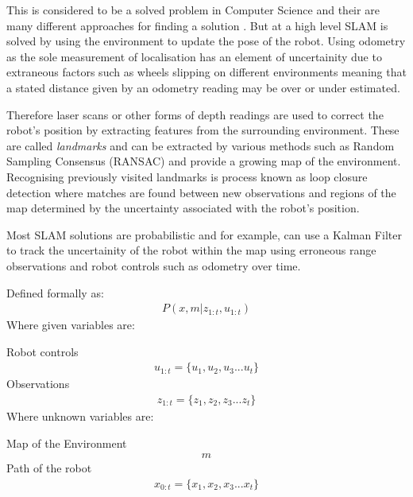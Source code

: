 \documentclass{mproj}
\begin{document}
This is considered to be a solved problem in Computer Science and their are many different approaches for finding a solution \cite{Hugh2006}. But at a high level SLAM is solved by using the environment to update the pose of the robot. Using odometry as the sole measurement of localisation has an element of uncertainity due to extraneous factors such as wheels slipping on different environments meaning that a stated distance given by an odometry reading may be over or under estimated. 

Therefore laser scans or other forms of depth readings are used to correct the robot's position by extracting features from the surrounding environment. These are called \textit{landmarks} and can be extracted by various methods such as Random Sampling Consensus (RANSAC) and provide a growing map of the environment. Recognising previously visited landmarks is process known as loop closure detection where matches are found between new observations  and regions of the map determined by the uncertainty associated  with the robot’s position\cite{labbe13appearance}.

Most SLAM solutions are probabilistic and for example, can use a Kalman Filter to track the uncertainity of the robot within the map using erroneous range observations and robot controls such as odometry over time.

\begin{tcolorbox}

Defined formally as:
\begin{align}
\textit{P}\left(x, m | z_{1:t}, u_{1:t}\right)
\end{align}
Where given variables are:


Robot controls
\begin{align}
u_{1:t} = \lbrace u_{1}, u_{2}, u_{3} ... u_{t} \rbrace 
\end{align}
Observations
\begin{align}
z_{1:t} = \lbrace z_{1}, z_{2}, z_{3} ... z_{t} \rbrace
\end{align}
Where unknown variables are:


Map of the Environment
\begin{align}
m
\end{align}
Path of the robot 
\begin{align}
x_{0:t} = \lbrace x_{1}, x_{2}, x_{3} ... x_{t} \rbrace
\end{align}

\end{tcolorbox}
\end{document}
